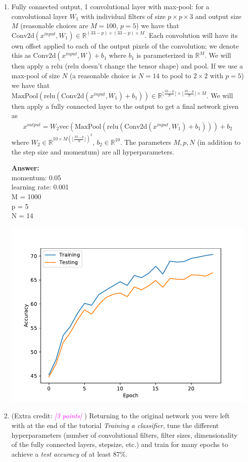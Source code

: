 \documentclass{article}
\newcommand{\field}[1]{\mathbb{#1}}
\newcommand{\1}{\mathbf{1}}
\newcommand{\R}{\field{R}} %
\def\vec{\text{vec}}
\newcommand{\grade}[1]{\small\textcolor{magenta}{\emph{[#1 points]}} \normalsize}
\begin{document}
\begin{enumerate}
  \item Fully connected output, 1 convolutional layer with max-pool: for a convolutional layer $W_1$ with individual filters of size $p \times p \times 3$ and output size $M$ (reasonable choices are $M=100$, $p=5$) we have that $\mathrm{Conv2d}(x^{input}, W_1) \in \R^{(33-p) \times (33-p) \times M}$. 
  Each convolution will have its own offset applied to each of the output pixels of the convolution; we denote this as $\mathrm{Conv2d}(x^{input}, W) + b_1$ where $b_1$ is parameterized in $\R^M$.
  We will then apply a relu (relu doesn't change the tensor shape) and pool. 
  If we use a max-pool of size $N$ (a reasonable choice is $N=14$ to pool to $2 \times 2$ with $p=5$) we have that $\textrm{MaxPool}( \mathrm{relu}( \mathrm{Conv2d}(x^{input}, W_1)+b_1)) \in \R^{\lfloor\frac{33-p}{N}\rfloor \times \lfloor\frac{33-p}{N}\rfloor \times M}$.
  We will then apply a fully connected layer to the output to get a final network given as
  \begin{align*}
  x^{output} = W_2 \vec(\textrm{MaxPool}( \mathrm{relu}( \mathrm{Conv2d}(x^{input}, W_1)+b_1))) + b_2
  \end{align*}
  where $W_2 \in \R^{10 \times M (\lfloor\frac{33-p}{N}\rfloor)^2}$, $b_2 \in \R^{10}$.
  The parameters $M,p,N$ (in addition to the step size and momentum) are all hyperparameters.
  
   \textbf{Answer:}\\
  momentum: 0.05\\
  learning rate: 0.001\\
 M = 1000\\
  p = 5\\
 N = 14
  
  \includegraphics[]{3_convNet.pdf}
  
  \item (Extra credit: \grade{3}) Returning to the original network you were left with at the end of the tutorial \emph{Training a classifier}, tune the different hyperparameters (number of convolutional filters, filter sizes, dimensionality of the fully connected layers, stepsize, etc.) and train for many epochs to achieve a \emph{test accuracy} of at least 87\%. 
\end{enumerate}
\end{document}
